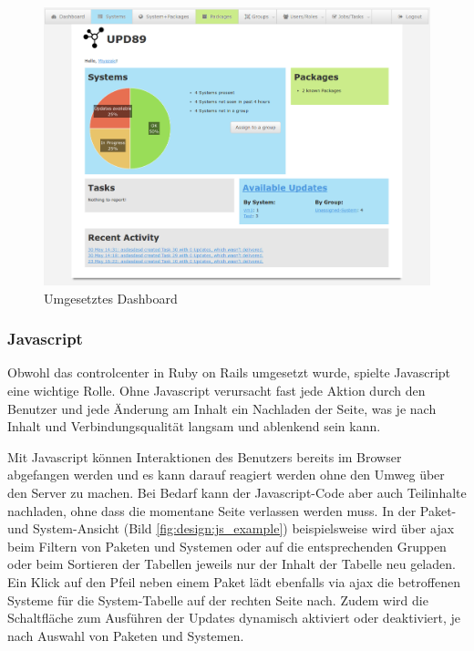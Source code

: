 \begin{figure}[H]
	\centering
	\includegraphics[width=\linewidth]{files/upd89-screenshot_dashboard}
	\caption{Umgesetztes Dashboard}
	\label{fig:design:dashboard}
\end{figure}

\subsubsection*{Javascript}

Obwohl das \gls{controlcenter} in Ruby on Rails umgesetzt wurde, spielte Javascript eine wichtige Rolle. Ohne Javascript verursacht fast jede Aktion durch den Benutzer und jede Änderung am Inhalt ein Nachladen der Seite, was je nach Inhalt und Verbindungsqualität langsam und ablenkend sein kann. 

Mit Javascript können Interaktionen des Benutzers bereits im Browser abgefangen werden und es kann darauf reagiert werden ohne den Umweg über den Server zu machen. Bei Bedarf kann der Javascript-Code aber auch Teilinhalte nachladen, ohne dass die momentane Seite verlassen werden muss. In der Paket- und System-Ansicht (Bild \ref{fig:design:js_example}) beispielsweise wird über \gls{ajax} beim Filtern von Paketen und Systemen oder auf die entsprechenden Gruppen oder beim Sortieren  der Tabellen jeweils nur der Inhalt der Tabelle neu geladen. Ein Klick auf den Pfeil neben einem Paket lädt ebenfalls via \gls{ajax} die betroffenen Systeme für die System-Tabelle auf der rechten Seite nach. Zudem wird die Schaltfläche zum Ausführen der Updates dynamisch aktiviert oder deaktiviert, je nach Auswahl von Paketen und Systemen.

